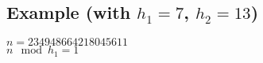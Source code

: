 \documentclass{article}
\begin{document}
{\subsection{Example (with $h_1=7$, $h_2 = 13$)}
$n=234948664218045611$\\
$n \mod h_1 = 1$\\
}
\end{document}
